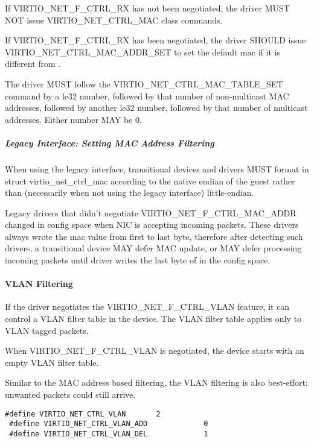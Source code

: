 If VIRTIO_NET_F_CTRL_RX has not been negotiated,
the driver MUST NOT issue VIRTIO_NET_CTRL_MAC class commands.

If VIRTIO_NET_F_CTRL_RX has been negotiated,
the driver SHOULD issue VIRTIO_NET_CTRL_MAC_ADDR_SET
to set the default mac if it is different from .

The driver MUST follow the VIRTIO_NET_CTRL_MAC_TABLE_SET command
by a le32 number, followed by that number of non-multicast
MAC addresses, followed by another le32 number, followed by
that number of multicast addresses.  Either number MAY be 0.

\subparagraph{Legacy Interface: Setting MAC Address Filtering}\label{sec:Device Types / Network Device / Device Operation / Control Virtqueue / Setting MAC Address Filtering / Legacy Interface: Setting MAC Address Filtering}
When using the legacy interface, transitional devices and drivers
MUST format  in struct virtio_net_ctrl_mac
according to the native endian of the guest rather than
(necessarily when not using the legacy interface) little-endian.

Legacy drivers that didn't negotiate VIRTIO_NET_F_CTRL_MAC_ADDR
changed  in config space when NIC is accepting
incoming packets. These drivers always wrote the mac value from
first to last byte, therefore after detecting such drivers,
a transitional device MAY defer MAC update, or MAY defer
processing incoming packets until driver writes the last byte
of  in the config space.

\paragraph{VLAN Filtering}\label{sec:Device Types / Network Device / Device Operation / Control Virtqueue / VLAN Filtering}

If the driver negotiates the VIRTIO_NET_F_CTRL_VLAN feature, it
can control a VLAN filter table in the device. The VLAN filter
table applies only to VLAN tagged packets.

When VIRTIO_NET_F_CTRL_VLAN is negotiated, the device starts with
an empty VLAN filter table.

\begin{note}
Similar to the MAC address based filtering, the VLAN filtering
is also best-effort: unwanted packets could still arrive.
\end{note}

\begin{lstlisting}
#define VIRTIO_NET_CTRL_VLAN       2
 #define VIRTIO_NET_CTRL_VLAN_ADD             0
 #define VIRTIO_NET_CTRL_VLAN_DEL             1
\end{lstlisting}

